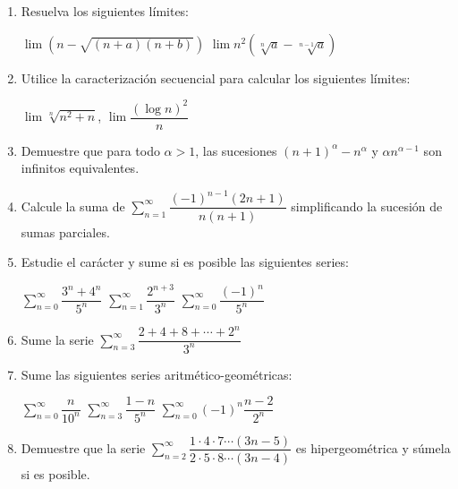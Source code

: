 \begin{enumerate}

\item Resuelva los siguientes límites:
\setcontadoralph
\begin{centrar}
\nitem $\lim \left( n-\sqrt{(n+a)(n+b)}\right)$\hfill
\nitem $\lim n^2\left( \sqrt[n]{a}-\sqrt[n-1]{a}\right)$
\end{centrar}


\item
Utilice la caracterización secuencial para calcular los siguientes límites:
\setcontadoralph
\begin{centrar}
\nitem $\lim \sqrt[n]{n^2+n}$,\hfill
\nitem $\lim \dfrac{(\log n)^2}{n}$
\end{centrar}

\item
Demuestre que para todo $\alpha>1$, las sucesiones $(n+1)^\alpha-n^\alpha$ y $\alpha n^{\alpha-1}$ son infinitos equivalentes.

\item
Calcule la suma de $\displaystyle\sum_{n=1}^\infty   \dfrac{(-1)^{n-1}(2n+1)}{n(n+1)}$ simplificando la sucesión de sumas parciales.

\item
Estudie el carácter y sume si es posible las siguientes series:
\setcontadoralph
\begin{centrar}
\nitem $\displaystyle\sum_{n=0}^\infty   \dfrac{3^n+4^n}{5^n}$\hfill
\nitem $\displaystyle\sum_{n=1}^\infty   \dfrac{2^{n+3}}{3^n}$ \hfill
\nitem $\displaystyle\sum_{n=0}^\infty   \dfrac{(-1)^n}{5^n}$ 
\end{centrar}


\item 
Sume la serie $\displaystyle\sum_{n=3}^\infty   \dfrac{2+4+8+\cdots +2^n}{3^n}$

\item
Sume las siguientes series aritmético-geométricas:
\setcontadoralph
\begin{centrar}
\nitem $\displaystyle\sum_{n=0}^\infty   \dfrac{n}{10^n}$ \hfill
\nitem $\displaystyle\sum_{n=3}^\infty   \dfrac{1-n}{5^n}$ \hfill
\nitem $\displaystyle\sum_{n=0}^\infty   (-1)^n\dfrac{n-2}{2^n}$
\end{centrar}


\item
Demuestre que la serie $\displaystyle\sum_{n=2}^\infty  \dfrac{1\cdot 4\cdot 7\cdots (3n-5)}%
{2\cdot 5\cdot 8 \cdots (3n-4)}$ es hipergeométrica y súmela si es posible.


\end{enumerate}
